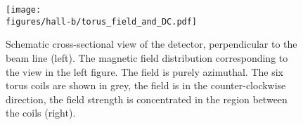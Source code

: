\begin{figure}[h!]\begin{center}
\texttt{[image: \\figures/hall-b/torus\_field\_and\_DC.pdf]}
\caption[Schematic cross-sectional view of the  detector, perpendicular to the beam line]{\label{fig:clas.dc.torus.cont}Schematic cross-sectional view of the  detector, perpendicular to the beam line (left). The magnetic field distribution corresponding to the view in the left figure. The field is purely azimuthal. The six torus coils are shown in grey, the field is in the counter-clockwise direction,  the field strength is concentrated in the region between the coils (right).}
\end{center}\end{figure}

\FloatBarrier